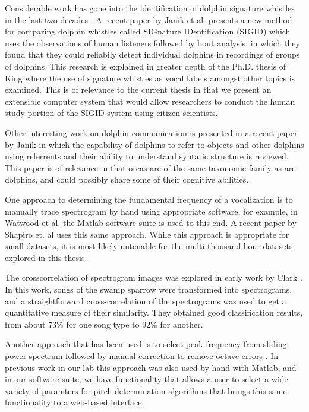 Considerable work has gone into the identification of dolphin
signature whistles in the last two decades \cite{sayigh90}.  A recent
paper by Janik et al. \cite{janik12} presents a new method for
comparing dolphin whistles called SIGnature IDentification (SIGID)
which uses the observations of human listeners followed by bout
analysis, in which they found that they could reliabily detect
individual dolphins in recordings of groups of dolphins.  This
research is explained in greater depth of the Ph.D. thesis of King
\cite{king12} where the use of signature whistles as vocal labels
amongst other topics is examined.  This is of relevance to the current
thesis in that we present an extensible computer system that would
allow researchers to conduct the human study portion of the SIGID
system using citizen scientists.

Other interesting work on dolphin communication is presented in a
recent paper by Janik \cite{janik2013cognitive} in which the
capability of dolphins to refer to objects and other dolphins using
referrents and their ability to understand syntatic structure is
reviewed.  This paper is of relevance in that orcas are of the same
taxonomic family as are dolphins, and could possibly share some of
their cognitive abilities.





One approach to determining the fundamental frequency of a
vocalization is to manually trace spectrogram by hand using
appropriate software, for example, in Watwood et al. \cite{watwood04}
the Matlab software suite is used to this end.  A recent paper by
Shapiro et. al \cite{shapiro06} uses this same approach.  While this
approach is appropriate for small datasets, it is most likely
untenable for the multi-thousand hour datasets explored in this
thesis.

The crosscorrelation of spectrogram images was explored in early work
by Clark \cite{clark87}.  In this work, songs of the swamp sparrow
were transformed into spectrograms, and a straightforward
cross-correlation of the spectrograms was used to get a quantitative
measure of their similarity.  They obtained good classification
results, from about 73\% for one song type to 92\% for another.

Another approach that has been used is to select peak frequency from
sliding power spectrum followed by manual correction to remove octave
errors \cite{buck93} \cite{janik94}.  In previous work in our lab
\cite{ness08} this approach was also used by hand with Matlab, and in
our software suite, we have functionality that allows a user to select
a wide variety of paramters for pitch determination algorithms that
brings this same functionality to a web-based interface.

